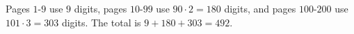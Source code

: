 Pages $1$-$9$ use $9$ digits, pages $10$-$99$ use $90\cdot2=180$ digits, and pages $100$-$200$ use $101\cdot3=303$ digits. The total is $9+180+303=\boxed{492}$.
